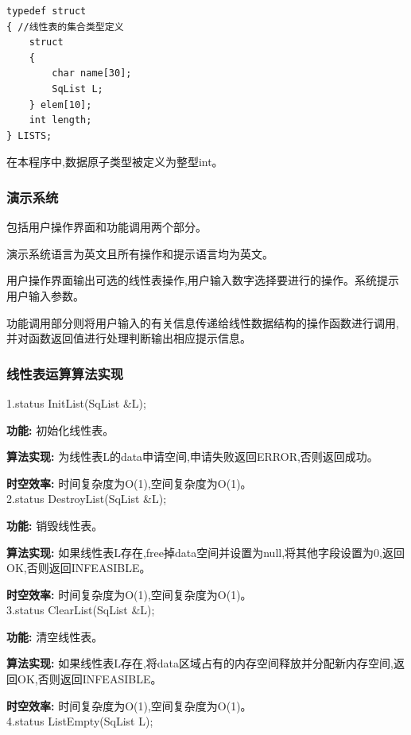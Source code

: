 \documentclass[supercite]{Experimental_Report}
\theoremstyle{definition}
\begin{document}
\begin{lstlisting}
typedef struct
{ //线性表的集合类型定义
    struct
    {
        char name[30];
        SqList L;
    } elem[10];
	int length;
} LISTS;

\end{lstlisting}

在本程序中,数据原子类型被定义为整型int。

\subsubsection{演示系统}

包括用户操作界面和功能调用两个部分。

演示系统语言为英文且所有操作和提示语言均为英文。

用户操作界面输出可选的线性表操作,用户输入数字选择要进行的操作。系统提示用户输入参数。

功能调用部分则将用户输入的有关信息传递给线性数据结构的操作函数进行调用,并对函数返回值进行处理判断输出相应提示信息。

\subsubsection{线性表运算算法实现}

1.status InitList(SqList \&L);

\textbf{功能: }初始化线性表。

\textbf{算法实现: }为线性表L的data申请空间,申请失败返回ERROR,否则返回成功。

\textbf{时空效率: }时间复杂度为O(1),空间复杂度为O(1)。\\

2.status DestroyList(SqList \&L);

\textbf{功能: }销毁线性表。

\textbf{算法实现: }如果线性表L存在,free掉data空间并设置为null,将其他字段设置为0,返回OK,否则返回INFEASIBLE。

\textbf{时空效率: }时间复杂度为O(1),空间复杂度为O(1)。\\

3.status ClearList(SqList \&L);

\textbf{功能: }清空线性表。

\textbf{算法实现: }如果线性表L存在,将data区域占有的内存空间释放并分配新内存空间,返回OK,否则返回INFEASIBLE。

\textbf{时空效率: }时间复杂度为O(1),空间复杂度为O(1)。\\

4.status ListEmpty(SqList L);
\end{document}
